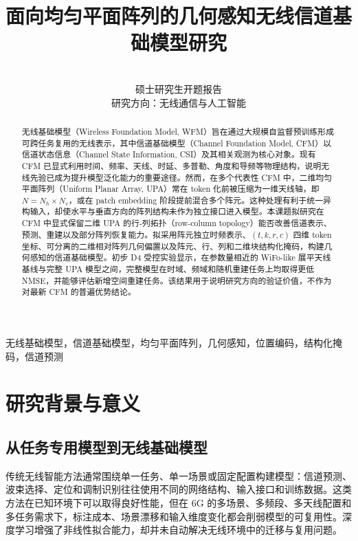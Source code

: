 \documentclass[journal]{IEEEtran}
\begin{document}
\title{面向均匀平面阵列的几何感知无线信道基础模型研究}

\author{~\\
硕士研究生开题报告\\
研究方向：无线通信与人工智能}

\maketitle

\begin{abstract}
无线基础模型（Wireless Foundation Model, WFM）旨在通过大规模自监督预训练形成可跨任务复用的无线表示，其中信道基础模型（Channel Foundation Model, CFM）以信道状态信息（Channel State Information, CSI）及其相关观测为核心对象。现有 CFM 已显式利用时间、频率、天线、时延、多普勒、角度和导频等物理结构，说明无线先验已成为提升模型泛化能力的重要途径。然而，在多个代表性 CFM 中，二维均匀平面阵列（Uniform Planar Array, UPA）常在 token 化前被压缩为一维天线轴，即 \(N=N_h\times N_v\)，或在 patch embedding 阶段提前混合多个阵元。这种处理有利于统一异构输入，却使水平与垂直方向的阵列结构未作为独立接口进入模型。本课题拟研究在 CFM 中显式保留二维 UPA 的行-列拓扑（row-column topology）能否改善信道表示、预测、重建以及部分阵列恢复能力。拟采用阵元独立时频表示、\((t,k,r,c)\) 四维 token 坐标、可分离的二维相对阵列几何偏置以及阵元、行、列和二维块结构化掩码，构建几何感知的信道基础模型。初步 D4 受控实验显示，在参数量相近的 WiFo-like 展平天线基线与完整 UPA 模型之间，完整模型在时域、频域和随机重建任务上均取得更低 NMSE，并能够评估新增空间重建任务。该结果用于说明研究方向的验证价值，不作为对最新 CFM 的普遍优势结论。
\end{abstract}

\begin{IEEEkeywords}
无线基础模型，信道基础模型，均匀平面阵列，几何感知，位置编码，结构化掩码，信道预测
\end{IEEEkeywords}

\section{研究背景与意义}

\subsection{从任务专用模型到无线基础模型}

传统无线智能方法通常围绕单一任务、单一场景或固定配置构建模型：信道预测、波束选择、定位和调制识别往往使用不同的网络结构、输入接口和训练数据。这类方法在已知环境下可以取得良好性能，但在 6G 的多场景、多频段、多天线配置和多任务需求下，标注成本、场景漂移和输入维度变化都会削弱模型的可复用性。深度学习增强了非线性拟合能力，却并未自动解决无线环境中的迁移与复用问题。
\end{document}

